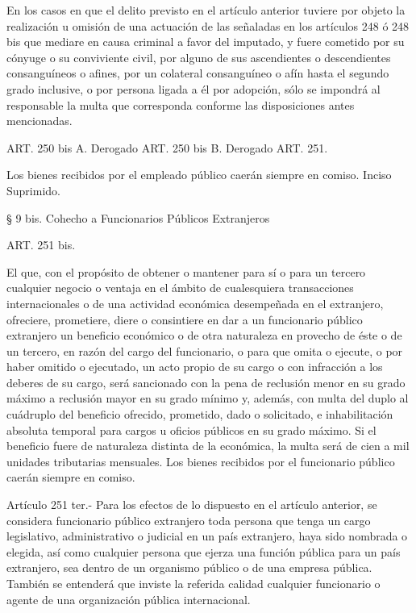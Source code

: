     En los casos en que el delito previsto en el artículo anterior tuviere por objeto la realización u omisión de una actuación de las señaladas en los artículos 248 ó 248 bis que mediare en causa criminal a favor del imputado, y fuere cometido por su cónyuge o su conviviente civil, por alguno de sus ascendientes o descendientes consanguíneos o afines, por un colateral consanguíneo o afín hasta el segundo grado inclusive, o por persona ligada a él por adopción, sólo se impondrá al responsable la multa que corresponda conforme las disposiciones antes mencionadas.


    ART. 250 bis A. Derogado
    ART. 250 bis B. Derogado
    ART. 251.

    Los bienes recibidos por el empleado público caerán siempre en comiso.
    Inciso Suprimido.





    § 9 bis. Cohecho a Funcionarios Públicos Extranjeros


    ART. 251 bis.

    El que, con el propósito de obtener o mantener para sí o para un tercero cualquier negocio o ventaja en el ámbito de cualesquiera transacciones internacionales o de una actividad económica desempeñada en el extranjero, ofreciere, prometiere, diere o consintiere en dar a un funcionario público extranjero un beneficio económico o de otra naturaleza en provecho de éste o de un tercero, en razón del cargo del funcionario, o para que omita o ejecute, o por haber omitido o ejecutado, un acto propio de su cargo o con infracción a los deberes de su cargo, será sancionado con la pena de reclusión menor en su grado máximo a reclusión mayor en su grado mínimo y, además, con multa del duplo al cuádruplo del beneficio ofrecido, prometido, dado o solicitado, e inhabilitación absoluta temporal para cargos u oficios públicos en su grado máximo. Si el beneficio fuere de naturaleza distinta de la económica, la multa será de cien a mil unidades tributarias mensuales.
    Los bienes recibidos por el funcionario público caerán siempre en comiso.


    Artículo 251 ter.- Para los efectos de lo dispuesto en el artículo anterior, se considera funcionario público extranjero toda persona que tenga un cargo legislativo, administrativo o judicial en un país extranjero, haya sido nombrada o elegida, así como cualquier persona que ejerza una función pública para un país extranjero, sea dentro de un organismo público o de una empresa pública. También se entenderá que inviste la referida calidad cualquier funcionario o agente de una organización pública internacional.


